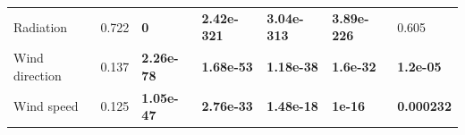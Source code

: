 \documentclass[a4paper, 12pt]{article}
\begin{document}
\begin{table}[t!]
{\begin{tabular}{@{}lllllll@{}}
            Radiation            & 0.722                                                                                      & \textbf{0}                                                                                 & \textbf{2.42e-321}                                                                         & \textbf{3.04e-313}                                                                         & \textbf{3.89e-226}                                                                         & 0.605                                                                                      \\
            Wind direction       & 0.137                                                                                      & \textbf{2.26e-78}                                                                          & \textbf{1.68e-53}                                                                          & \textbf{1.18e-38}                                                                          & \textbf{1.6e-32}                                                                           & \textbf{1.2e-05}                                                                           \\
            Wind speed           & 0.125                                                                                      & \textbf{1.05e-47}                                                                          & \textbf{2.76e-33}                                                                          & \textbf{1.48e-18}                                                                          & \textbf{1e-16}                                                                             & \textbf{0.000232}                                                                          \\ \bottomrule
            \end{tabular}%
        }
    \end{table}
    \\
\end{document}
